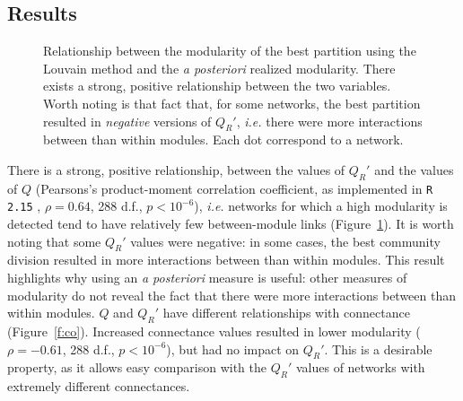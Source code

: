 \documentclass[12pt,oneside]{article}
\begin{document}
\subsection{Results}

\begin{figure}[tbp]
	\begin{center}
	\end{center}
	\caption{Relationship between the modularity of the best partition using the Louvain method and the \emph{a posteriori} realized modularity. There exists a strong, positive relationship between the two variables. Worth noting is that fact that, for some networks, the best partition resulted in \emph{negative} versions of $Q_R'$, \emph{i.e.} there were more interactions between than within modules. Each dot correspond to a network.}
	\label{f:qqr}
\end{figure}

There is a strong, positive relationship, between the values of $Q_R'$ and the
values of $Q$ (Pearsons's product-moment correlation coefficient, as implemented in \texttt{R 2.15} \cite{team_r:_2008}, $\rho =
0.64$, 288 d.f., $p < 10^{-6}$), \emph{i.e.} networks for which a high
modularity is detected tend to have relatively few between-module links
(Figure~\ref{f:qqr}). It is worth noting that some $Q_R'$ values were negative:
in some cases, the best community division resulted in more interactions
between than within modules. This result highlights why using an \emph{a
posteriori} measure is useful: other measures of modularity do not reveal the
fact that there were more interactions between than within modules. $Q$ and
$Q_R'$ have different relationships with connectance (Figure~\ref{f:co}).
Increased connectance values resulted in lower modularity ($\rho = -0.61$, 288
d.f., $p < 10^{-6}$), but had no impact on $Q_R'$. This is a desirable
property, as it allows easy comparison with the $Q_R'$ values of networks with
extremely different connectances.
\end{document}
